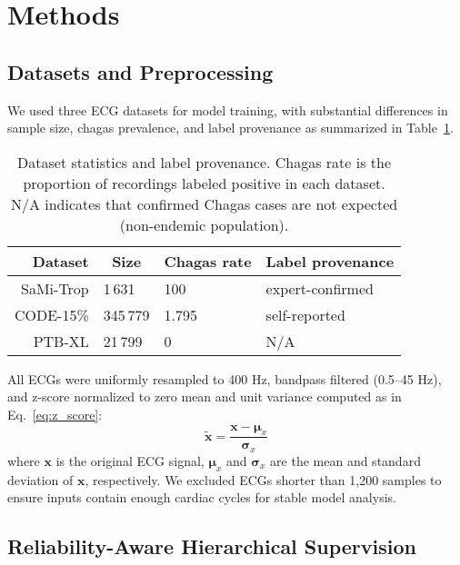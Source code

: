 \section{Methods}
\label{sec:methods}


\subsection{Datasets and Preprocessing}
\label{subsec:data}


We used three ECG datasets for model training, with substantial differences in sample size, chagas prevalence, and label provenance as summarized in Table~\ref{tab:dataset_stats}.

\begin{table}[!htp]
\centering
\begin{tabular}{rlll}
\toprule
Dataset & \multicolumn{1}{c}{Size} & \multicolumn{1}{c}{Chagas rate} & Label provenance \\
\midrule
SaMi-Trop & 1\,631   & 100 & expert-confirmed \\
CODE-15\% & 345\,779 & 1.795   & self-reported \\
PTB-XL    & 21\,799  & 0   & N/A \\
\bottomrule
\end{tabular}
\caption{Dataset statistics and label provenance. Chagas rate is the proportion of recordings labeled positive in each dataset. N/A indicates that confirmed Chagas cases are not expected (non-endemic population).}
\label{tab:dataset_stats}
\end{table}

All ECGs were uniformly resampled to 400 Hz, bandpass filtered (0.5–45 Hz), and z-score normalized to zero mean and unit variance computed as in Eq.~\ref{eq:z_score}:
\begin{equation}
\label{eq:z_score}
\tilde{\mathbf{x}} = \frac{\mathbf{x} - \boldsymbol{\mu}_x}{\boldsymbol{\sigma}_x}
\end{equation}
where $\mathbf{x}$ is the original ECG signal, $\boldsymbol{\mu}_x$ and $\boldsymbol{\sigma}_x$ are the mean and standard deviation of $\mathbf{x}$, respectively. We excluded ECGs shorter than 1,200 samples to ensure inputs contain enough cardiac cycles for stable model analysis.

\subsection{Reliability-Aware Hierarchical Supervision}
\label{subsec:reliability}

